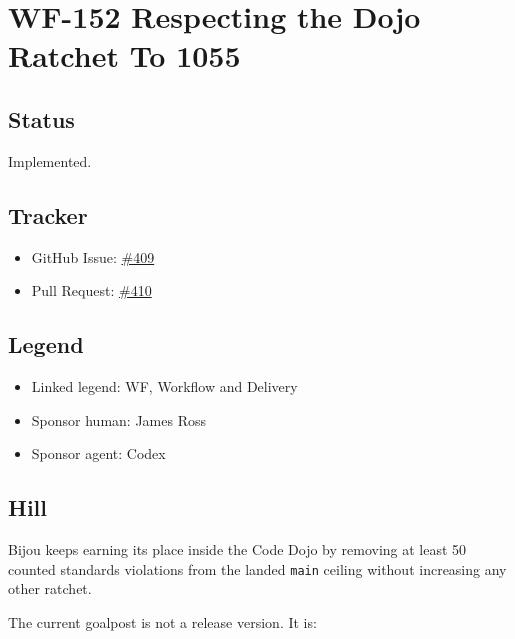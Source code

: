 \chapter{WF-152 Respecting the Dojo Ratchet To 1055}\label{record-234}

\smallskip

\section{Status}\label{record-234-status}

Implemented.

\section{Tracker}\label{record-234-tracker}

\begin{itemize}
\tightlist
\item
  GitHub Issue: \href{https://github.com/flyingrobots/bijou/issues/409}{\#409}
\item
  Pull Request: \href{https://github.com/flyingrobots/bijou/pull/410}{\#410}
\end{itemize}

\section{Legend}\label{record-234-legend}

\begin{itemize}
\tightlist
\item
  Linked legend: WF, Workflow and Delivery
\item
  Sponsor human: James Ross
\item
  Sponsor agent: Codex
\end{itemize}

\section{Hill}\label{record-234-hill}

Bijou keeps earning its place inside the Code Dojo by removing at least 50 counted standards violations from the landed \texttt{m\allowbreak{}a\allowbreak{}i\allowbreak{}n} ceiling without increasing any other ratchet.

The current goalpost is not a release version. It is:

